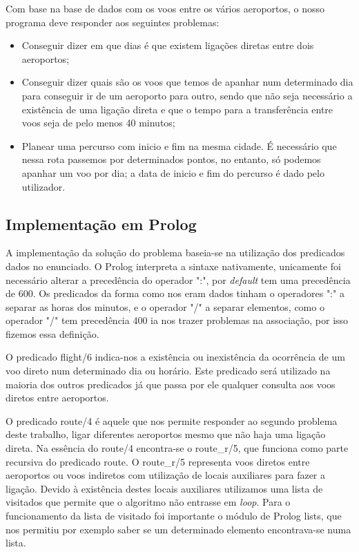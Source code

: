 \documentclass[12pt,a4paper]{article}
\begin{document}
Com base na base de dados com os voos entre os vários aeroportos, o nosso programa deve responder aos seguintes problemas: 
\begin{itemize}
 \item Conseguir dizer em que dias é que existem ligações diretas entre dois aeroportos;
 \item Conseguir dizer quais são os voos que temos de apanhar num determinado dia para conseguir ir de um aeroporto para outro, sendo que não seja necessário a existência de uma ligação direta e que o tempo para a transferência entre voos seja de pelo menos 40 minutos;
 \item Planear uma percurso com inicio e fim na mesma cidade. É necessário que nessa rota passemos por determinados pontos, no entanto, só podemos apanhar um voo por dia; a data de inicio e fim do percurso é dado pelo utilizador.   
\end{itemize}

\subsection{Implementação em Prolog}
A implementação da solução do problema baseia-se na utilização dos predicados dados no enunciado. O Prolog interpreta a sintaxe nativamente, unicamente foi necessário alterar a precedência do operador ":", por \textit{default} tem uma precedência de 600. Os predicados da forma como nos eram dados tinham o operadores ":" a separar as horas dos minutos, e o operador "/" a separar elementos, como o operador "/" tem precedência 400 ia nos trazer problemas na associação, por isso fizemos essa definição.

O predicado flight/6 indica-nos a existência ou inexistência da ocorrência de um voo direto num determinado dia ou horário. Este predicado será utilizado na maioria dos outros predicados já que passa por ele qualquer consulta aos voos diretos entre aeroportos.

O predicado route/4 é aquele que nos permite responder ao segundo problema deste trabalho, ligar diferentes aeroportos mesmo que não haja uma ligação direta. Na essência do route/4 encontra-se o route\_r/5, que funciona como parte recursiva do predicado route. O route\_r/5 representa voos diretos entre aeroportos ou voos indiretos com utilização de locais auxiliares para fazer a ligação. Devido à existência destes locais auxiliares utilizamos uma lista de visitados que permite que o algoritmo não entrasse em \textit{loop}. Para o funcionamento da lista de visitado foi importante o módulo de Prolog lists, que nos permitiu por exemplo saber se um determinado elemento encontrava-se numa lista.
\end{document}
